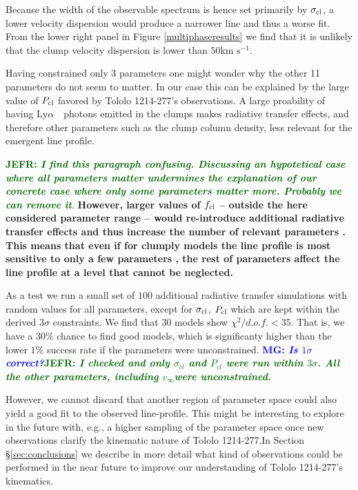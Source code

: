 \documentclass[a4,useAMS,usenatbib,usegraphicx]{mn2e}
\newcommand{\tol}{Tololo 1214-277}
\newcommand{\lya}{\ifmmode{{\rm Ly}\alpha}\else Ly$\alpha$\ \fi}
\newcommand{\kms}{km s$^{-1}$}
\newcommand{\mg}[1]{\textcolor{blue}{\bf MG: \textit{#1}}}
\newcommand{\jefr}[1]{\textcolor{darkgreen}{\bf JEFR: \textit{#1}}}
\begin{document}
Because the width of the observable spectrum is hence set primarily by
$\sigma_{\rm cl}$, a lower velocity dispersion would produce a
narrower line and thus a worse fit. 
From the lower right panel in Figure \ref{multiphaseresults} we find that it
is unlikely that the clump velocity dispersion is lower than
$50$\kms. 

Having constrained only 3 parameters one might wonder why the other 11
parameters do not seem to matter.
In our case this can be explained by the large value of $P_{\rm cl}$
favored by \tol's observations. 
A large proability of having \lya\ photons emitted in the clumps
makes radiative transfer effects, and therefore other parameters such
as the clump column density, less relevant for the emergent line
profile. 


\jefr{I find this paragraph confusing. Discussing an hypotetical case where
all parameters matter undermines the explanation of our concrete case
where only some parameters matter more. Probably we can remove it}.
{\bf However, larger values of $f_{\rm cl}$ -- outside the here considered parameter range -- would re-introduce
additional radiative transfer effects and thus increase the number of
relevant parameters \citep[see ][for details]{2017arXiv170406278G}.   
This means that even  
if for clumply models the line profile is most sensitive to only
a few parameters \citep{Gronke2016}, the rest of parameters
affect the line profile at a level that cannot be neglected.}

As a test we run a small set of $100$ additional radiative
transfer simulations with random values for all parameters, except for
$\sigma_{\rm cl}$, $P_{\rm cl}$ which are kept within the derived $3\sigma$
constraints. We find that $30$ models show $\chi^2/d.o.f.<35$.
That is, we have a $30\%$ chance to find good models, which is
significanty higher than the lower $1\%$ success rate if the
parameters were unconstrained.  
\mg{Is $1\sigma$ correct?}\jefr{I checked and only $\sigma_{cl}$ and
  $P_{cl}$ were run within $3\sigma$. All the other parameters,
  including $v_{\infty}$were
  unconstrained.} 

However, we cannot discard that another region of parameter space
could also yield a good fit to the observed line-profile.
This might be interesting to explore in the
future with, e.g., a higher sampling of the parameter space once new 
observations  clarify the kinematic nature of \tol.In
  Section \S \ref{sec:conclusions} we describe  in more detail what
  kind of observations could be performed in the near future to
  improve our understanding of \tol's kinematics.
\end{document}
